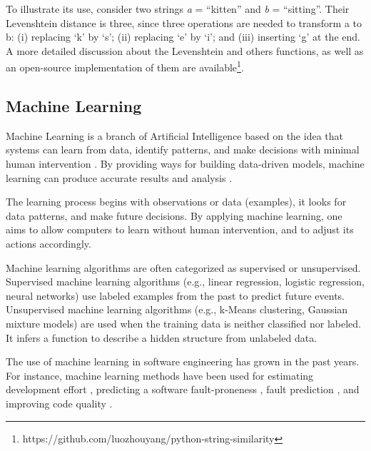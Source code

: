 To illustrate its use, consider two strings \textit{a} = ``kitten'' and \textit{b} = ``sitting''. Their Levenshtein distance is three, since three operations are needed to transform a to b: (i) replacing `k' by `s'; (ii) replacing `e' by `i'; and (iii) inserting `g' at the end. A more detailed discussion about the Levenshtein and others functions, as well as an open-source implementation of them are available\footnote{https://github.com/luozhouyang/python-string-similarity}.



\subsection{Machine Learning}

Machine Learning is a branch of Artificial Intelligence based on the idea that systems can learn from data, identify patterns, and make decisions with minimal human intervention \citep{michie1994machine}. By providing ways for building data-driven models, machine learning can produce accurate results and analysis \citep{zhang2003machine}.

The learning process begins with observations or data (examples), it looks for data patterns, and make future decisions. By applying machine learning, one aims to allow computers to learn without human intervention, and to adjust its actions accordingly.

Machine learning algorithms are often categorized as supervised or unsupervised. Supervised machine learning algorithms (e.g., linear regression, logistic regression, neural networks) use labeled examples from the past to predict future events. Unsupervised machine learning algorithms (e.g., k-Means clustering, Gaussian mixture models) are used when the training data is neither classified nor labeled. It infers a function to describe a hidden structure from unlabeled data. 

The use of machine learning in software engineering has grown in the past years. For instance, machine learning methods have been used for estimating development effort \citep{srinivasan1995machine,baskeles2007software}, predicting a software fault-proneness \citep{gondra2008applying}, fault prediction \citep{shepperd2014researcher}, and improving code quality \citep{malhotra2012fault}.